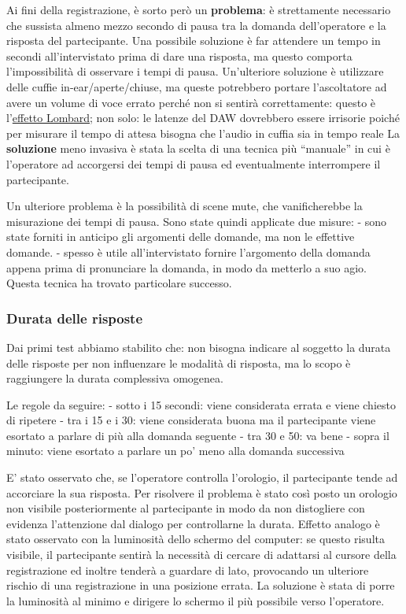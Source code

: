 \documentclass[
]{article}
\begin{document}
Ai fini della registrazione, è sorto però un \textbf{problema}: è strettamente necessario che sussista almeno mezzo secondo di pausa tra la domanda dell'operatore e la risposta del partecipante. Una possibile soluzione è far attendere un tempo in secondi all'intervistato prima di dare una risposta, ma questo comporta l'impossibilità di osservare i tempi di pausa. Un'ulteriore soluzione è utilizzare delle cuffie in-ear/aperte/chiuse, ma queste potrebbero portare l'ascoltatore ad avere un volume di voce errato perché non si sentirà correttamente: questo è l'\hyperref[Effetto-Lombard-e-la-cuffia-nel-doppiaggio-per-una-voce-naturale]{effetto Lombard}; non solo: le latenze del DAW dovrebbero essere irrisorie poiché per misurare il tempo di attesa bisogna che l'audio in cuffia sia in tempo reale La \textbf{soluzione} meno invasiva è stata la scelta di una tecnica più ``manuale'' in cui è l'operatore ad accorgersi dei tempi di pausa ed eventualmente interrompere il partecipante.

Un ulteriore problema è la possibilità di scene mute, che vanificherebbe la misurazione dei tempi di pausa. Sono state quindi applicate due misure: - sono state forniti in anticipo gli argomenti delle domande, ma non le effettive domande. - spesso è utile all'intervistato fornire l'argomento della domanda appena prima di pronunciare la domanda, in modo da metterlo a suo agio. Questa tecnica ha trovato particolare successo.

\subsubsection{Durata delle risposte}\label{durata-delle-risposte}

Dai primi test abbiamo stabilito che: non bisogna indicare al soggetto la durata delle risposte per non influenzare le modalità di risposta, ma lo scopo è raggiungere la durata complessiva omogenea.

Le regole da seguire: - sotto i 15 secondi: viene considerata errata e viene chiesto di ripetere - tra i 15 e i 30: viene considerata buona ma il partecipante viene esortato a parlare di più alla domanda seguente - tra 30 e 50: va bene - sopra il minuto: viene esortato a parlare un po' meno alla domanda successiva

E' stato osservato che, se l'operatore controlla l'orologio, il partecipante tende ad accorciare la sua risposta. Per risolvere il problema è stato così posto un orologio non visibile posteriormente al partecipante in modo da non distogliere con evidenza l'attenzione dal dialogo per controllarne la durata. Effetto analogo è stato osservato con la luminosità dello schermo del computer: se questo risulta visibile, il partecipante sentirà la necessità di cercare di adattarsi al cursore della registrazione ed inoltre tenderà a guardare di lato, provocando un ulteriore rischio di una registrazione in una posizione errata. La soluzione è stata di porre la luminosità al minimo e dirigere lo schermo il più possibile verso l'operatore.
\end{document}
